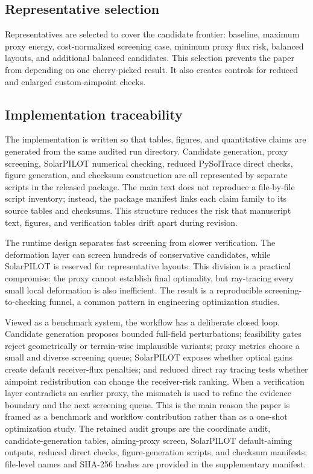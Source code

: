 \documentclass[final,3p,times]{elsarticle}
\begin{document}
\subsection{Representative selection}
Representatives are selected to cover the candidate frontier: baseline, maximum proxy energy, cost-normalized screening case, minimum proxy flux risk, balanced layouts, and additional balanced candidates. This selection prevents the paper from depending on one cherry-picked result. It also creates controls for reduced and enlarged custom-aimpoint checks.

\subsection{Implementation traceability}
The implementation is written so that tables, figures, and quantitative claims are generated from the same audited run directory. Candidate generation, proxy screening, SolarPILOT numerical checking, reduced PySolTrace direct checks, figure generation, and checksum construction are all represented by separate scripts in the released package. The main text does not reproduce a file-by-file script inventory; instead, the package manifest links each claim family to its source tables and checksums. This structure reduces the risk that manuscript text, figures, and verification tables drift apart during revision.

The runtime design separates fast screening from slower verification. The deformation layer can screen hundreds of conservative candidates, while SolarPILOT is reserved for representative layouts. This division is a practical compromise: the proxy cannot establish final optimality, but ray-tracing every small local deformation is also inefficient. The result is a reproducible screening-to-checking funnel, a common pattern in engineering optimization studies.

Viewed as a benchmark system, the workflow has a deliberate closed loop. Candidate generation proposes bounded full-field perturbations; feasibility gates reject geometrically or terrain-wise implausible variants; proxy metrics choose a small and diverse screening queue; SolarPILOT exposes whether optical gains create default receiver-flux penalties; and reduced direct ray tracing tests whether aimpoint redistribution can change the receiver-risk ranking. When a verification layer contradicts an earlier proxy, the mismatch is used to refine the evidence boundary and the next screening queue. This is the main reason the paper is framed as a benchmark and workflow contribution rather than as a one-shot optimization study. The retained audit groups are the coordinate audit, candidate-generation tables, aiming-proxy screen, SolarPILOT default-aiming outputs, reduced direct checks, figure-generation scripts, and checksum manifests; file-level names and SHA-256 hashes are provided in the supplementary manifest.
\end{document}
